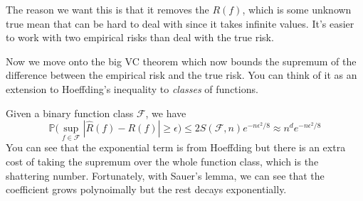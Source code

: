   The reason we want this is that it removes the $R(f)$, which is some unknown true mean that can be hard to deal with since it takes infinite values. It's easier to work with two empirical risks than deal with the true risk. 

  Now we move onto the big VC theorem which now bounds the supremum of the difference between the empirical risk and the true risk. You can think of it as an extension to Hoeffding's inequality to \textit{classes} of functions. 

  \begin{theorem}[VC Theorem]
    Given a binary function class $\mathcal{F}$, we have
    \begin{equation}
      \mathbb{P} \bigg( \sup_{f \in \mathcal{F}} | \hat{R} (f) - R(f) | \geq \epsilon \bigg) \leq 2 S(\mathcal{F}, n) e^{-n \epsilon^2 / 8} \approx n^d e^{-n \epsilon^2 / 8}
    \end{equation}
    You can see that the exponential term is from Hoeffding but there is an extra cost of taking the supremum over the whole function class, which is the shattering number. Fortunately, with Sauer's lemma, we can see that the coefficient grows polynoimally but the rest decays exponentially. 
  \end{theorem}
